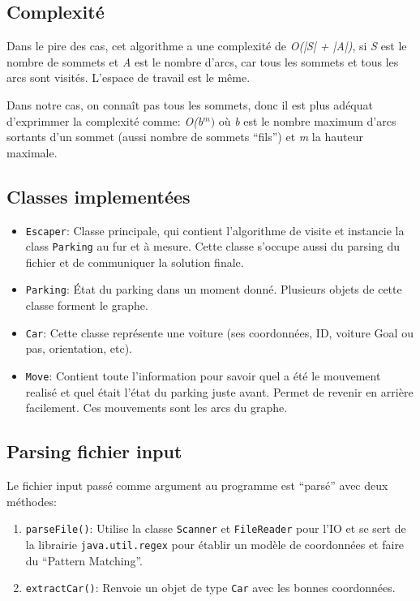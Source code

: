 \documentclass[11pt,a4paper]{article}
\begin{document}
\subsection{Complexité}

Dans le pire des cas, cet algorithme a une complexité de \emph{O(|S| +
  |A|)}, si \emph{S} est le nombre de sommets et \emph{A} est le
nombre d'arcs, car tous les sommets et tous les arcs sont
visités. L'espace de travail est le même.

\medbreak

Dans notre cas, on connaît pas tous les sommets, donc il est plus
adéquat d'exprimmer la complexité comme: \emph{O(b$^{m})$} où \emph{b}
est le nombre maximum d'arcs sortants d'un sommet (aussi nombre de
sommets ``fils'') et \emph{m} la hauteur maximale.



\subsection{Classes implementées}

\begin{itemize}
\item \texttt{Escaper}: Classe principale, qui contient l'algorithme
  de visite et instancie la class \texttt{Parking} au fur et à
  mesure. Cette classe s'occupe aussi du parsing du fichier et de
  communiquer la solution finale.
\item \texttt{Parking}: État du parking dans un moment
  donné. Plusieurs objets de cette classe forment le graphe.
\item \texttt{Car}: Cette classe représente une voiture (ses
  coordonnées, ID, voiture Goal ou pas, orientation, etc).
\item \texttt{Move}: Contient toute l'information pour savoir quel a
  été le mouvement realisé et quel était l'état du parking juste
  avant. Permet de revenir en arrière facilement. Ces mouvements sont
  les arcs du graphe.
\end{itemize}



\subsection{Parsing fichier input}

Le fichier input passé comme argument au programme est ``parsé'' avec
deux méthodes:

\begin{enumerate}
\item \texttt{parseFile()}: Utilise la classe \texttt{Scanner} et
  \texttt{FileReader} pour l'IO et se sert de la librairie
  \texttt{java.util.regex} pour établir un modèle de coordonnées et
  faire du ``Pattern Matching''.
\item \texttt{extractCar()}: Renvoie un objet de type \texttt{Car}
  avec les bonnes coordonnées.
\end{enumerate}
\end{document}
